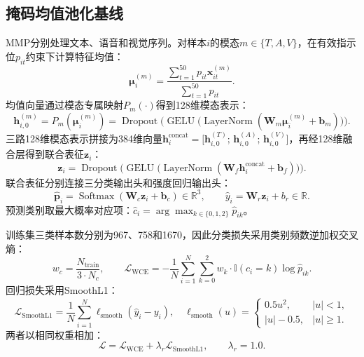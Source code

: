 \documentclass[UTF8,a4paper,11pt]{ctexart}
\begin{document}
\subsection{掩码均值池化基线}\label{subsec:q2_base}
MMP分别处理文本、语音和视觉序列。对样本$i$的模态$m \in \{T, A, V\}$，在有效指示位$p_{it}$约束下计算特征均值：
\begin{equation}
\boldsymbol\mu_i^{(m)} = \frac{\sum_{t=1}^{50} p_{it} \mathbf x_{it}^{(m)}}{\sum_{t=1}^{50} p_{it}}.
\label{eq:q2_mean_pool}
\end{equation}
均值向量通过模态专属映射$P_m(\cdot)$得到128维模态表示：
\begin{equation}
\mathbf h_{i,0}^{(m)} = P_m\left(\boldsymbol\mu_i^{(m)}\right) = \operatorname{Dropout}\Big(\operatorname{GELU}\big(\operatorname{LayerNorm}(\mathbf W_m \boldsymbol\mu_i^{(m)} + \mathbf b_m)\big)\Big).
\label{eq:q2_proj_layer}
\end{equation}
三路128维模态表示拼接为384维向量$\mathbf h_i^{\mathrm{concat}} = \big[\mathbf h_{i,0}^{(T)};\, \mathbf h_{i,0}^{(A)};\, \mathbf h_{i,0}^{(V)}\big]$，再经128维融合层得到联合表征$\mathbf z_i$：
\begin{equation}
\mathbf z_i = \operatorname{Dropout}\Big(\operatorname{GELU}\big(\operatorname{LayerNorm}(\mathbf W_f \mathbf h_i^{\mathrm{concat}} + \mathbf b_f)\big)\Big).
\end{equation}
联合表征分别连接三分类输出头和强度回归输出头：
\begin{equation}
\hat{\mathbf p}_i = \operatorname{Softmax}(\mathbf W_c \mathbf z_i + \mathbf b_c) \in \mathbb R^3,\qquad
\hat y_i = \mathbf W_r \mathbf z_i + b_r \in \mathbb R.
\label{eq:q2_heads}
\end{equation}
预测类别取最大概率对应项：$\hat c_i = \arg\max_{k \in \{0,1,2\}} \hat p_{ik}$。

训练集三类样本数分别为967、758和1670，因此分类损失采用类别频数逆加权交叉熵：
\begin{equation}
w_c = \frac{N_{\mathrm{train}}}{3 \cdot N_c},\qquad
\mathcal L_{\mathrm{WCE}} = -\frac{1}{N}\sum_{i=1}^N \sum_{k=0}^2 w_k \cdot \mathbb I(c_i = k) \log \hat p_{ik}.
\end{equation}
回归损失采用SmoothL1：
\begin{equation}
\mathcal L_{\mathrm{SmoothL1}} = \frac{1}{N}\sum_{i=1}^N \ell_{\mathrm{smooth}}(\hat y_i - y_i),\quad
\ell_{\mathrm{smooth}}(u) = \begin{cases}
0.5 u^2, & |u| < 1,\\
|u| - 0.5, & |u| \ge 1.
\end{cases}
\end{equation}
两者以相同权重相加：
\begin{equation}
\mathcal L = \mathcal L_{\mathrm{WCE}} + \lambda_r \mathcal L_{\mathrm{SmoothL1}},\qquad \lambda_r = 1.0.
\label{eq:q2_loss_full}
\end{equation}
\end{document}

